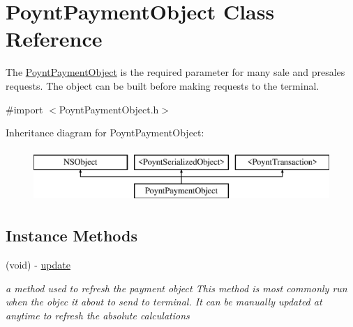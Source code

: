 \hypertarget{interface_poynt_payment_object}{}\section{Poynt\+Payment\+Object Class Reference}
\label{interface_poynt_payment_object}


The \hyperlink{interface_poynt_payment_object}{Poynt\+Payment\+Object} is the required parameter for many sale and presales requests. The object can be built before making requests to the terminal.  




{\ttfamily \#import $<$Poynt\+Payment\+Object.\+h$>$}

Inheritance diagram for Poynt\+Payment\+Object\+:\begin{figure}[H]
\begin{center}
\leavevmode
\includegraphics[height=2.000000cm]{interface_poynt_payment_object}
\end{center}
\end{figure}
\subsection*{Instance Methods}
\begin{DoxyCompactItemize}
\item 
(void) -\/ \hyperlink{interface_poynt_payment_object_ac5c54df7ed3b930268c8d7752c101725}{update}
\begin{DoxyCompactList}\small\item\em a method used to refresh the payment object  This method is most commonly run when the objec it about to send to terminal. It can be manually updated at anytime to refresh the absolute calculations \end{DoxyCompactList}\end{DoxyCompactItemize}
